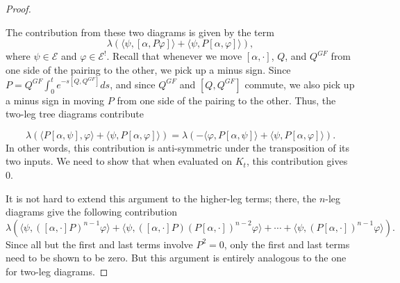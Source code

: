 \documentclass[11pt]{amsart}
\newcommand{\E}{\mscr{E}}
\newcommand{\mscr}{\mathscr}
\numberwithin{equation}{section}
\begin{document}
\begin{proof}
\begin{figure}[h]
\end{figure}
The contribution from these two diagrams is given by the term
\[
\lambda\left(\langle \psi,[\alpha, P\varphi]\rangle+\langle \psi,P[\alpha, \varphi]\rangle  \right), 
\]
where $\psi \in \E$ and $\varphi \in \E^!$. Recall that whenever we move $[\alpha, \cdot]$, $Q$, and $Q^{GF}$ from one side of the pairing to the other, we pick up a minus sign. Since $P= Q^{GF}\int_0^t e^{-s[Q,Q^{GF}]}ds$, and since $Q^{GF}$ and $[Q,Q^{GF}]$ commute, we also pick up a minus sign in moving $P$ from one side of the pairing to the other. Thus, the two-leg tree diagrams contribute

\[
\lambda\left(\langle P[\alpha,\psi],\varphi\rangle+\langle \psi,P[\alpha, \varphi]\rangle  \right)=\lambda\left(-\langle\varphi, P[\alpha,\psi]\rangle+\langle \psi,P[\alpha, \varphi]\rangle  \right). 
\]
In other words, this contribution is anti-symmetric under the transposition of its two inputs. We need to show that when evaluated on $K_t$, this contribution gives 0.

It is not hard to extend this argument to the higher-leg terms; there, the $n$-leg diagrams give the following contribution
\[
\lambda\left(\langle \psi, ([\alpha,\cdot] P)^{n-1}\varphi \rangle +\langle \psi, ([\alpha,\cdot] P)(P[\alpha,\cdot])^{n-2}\varphi \rangle+\cdots+\langle \psi, (P[\alpha,\cdot])^{n-1}\varphi \rangle\right).
\]
Since all but the first and last terms involve $P^2=0$, only the first and last terms need to be shown to be zero. But this argument is entirely analogous to the one for two-leg diagrams.
\end{proof}
\end{document}
